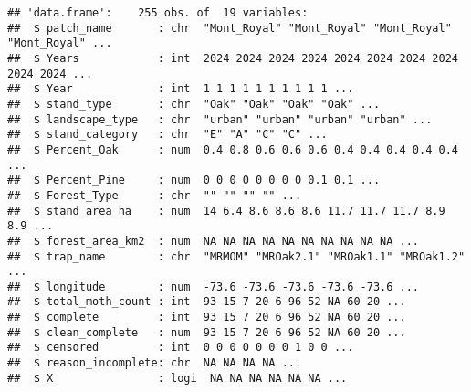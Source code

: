 \documentclass[
]{article}
\newenvironment{Shaded}{\begin{snugshade}}{\end{snugshade}}
\newcommand{\DocumentationTok}[1]{\textcolor[rgb]{0.56,0.35,0.01}{\textbf{\textit{#1}}}}
\newcommand{\FunctionTok}[1]{\textcolor[rgb]{0.13,0.29,0.53}{\textbf{#1}}}
\newcommand{\NormalTok}[1]{#1}
\newcommand{\OtherTok}[1]{\textcolor[rgb]{0.56,0.35,0.01}{#1}}
\newcommand{\SpecialCharTok}[1]{\textcolor[rgb]{0.81,0.36,0.00}{\textbf{#1}}}
\begin{document}
\begin{verbatim}
## 'data.frame':    255 obs. of  19 variables:
##  $ patch_name       : chr  "Mont_Royal" "Mont_Royal" "Mont_Royal" "Mont_Royal" ...
##  $ Years            : int  2024 2024 2024 2024 2024 2024 2024 2024 2024 2024 ...
##  $ Year             : int  1 1 1 1 1 1 1 1 1 1 ...
##  $ stand_type       : chr  "Oak" "Oak" "Oak" "Oak" ...
##  $ landscape_type   : chr  "urban" "urban" "urban" "urban" ...
##  $ stand_category   : chr  "E" "A" "C" "C" ...
##  $ Percent_Oak      : num  0.4 0.8 0.6 0.6 0.6 0.4 0.4 0.4 0.4 0.4 ...
##  $ Percent_Pine     : num  0 0 0 0 0 0 0 0 0.1 0.1 ...
##  $ Forest_Type      : chr  "" "" "" "" ...
##  $ stand_area_ha    : num  14 6.4 8.6 8.6 8.6 11.7 11.7 11.7 8.9 8.9 ...
##  $ forest_area_km2  : num  NA NA NA NA NA NA NA NA NA NA ...
##  $ trap_name        : chr  "MRMOM" "MROak2.1" "MROak1.1" "MROak1.2" ...
##  $ longitude        : num  -73.6 -73.6 -73.6 -73.6 -73.6 ...
##  $ total_moth_count : int  93 15 7 20 6 96 52 NA 60 20 ...
##  $ complete         : int  93 15 7 20 6 96 52 NA 60 20 ...
##  $ clean_complete   : num  93 15 7 20 6 96 52 NA 60 20 ...
##  $ censored         : int  0 0 0 0 0 0 0 1 0 0 ...
##  $ reason_incomplete: chr  NA NA NA NA ...
##  $ X                : logi  NA NA NA NA NA NA ...
\end{verbatim}

\begin{Shaded}
\end{Shaded}
\end{document}
